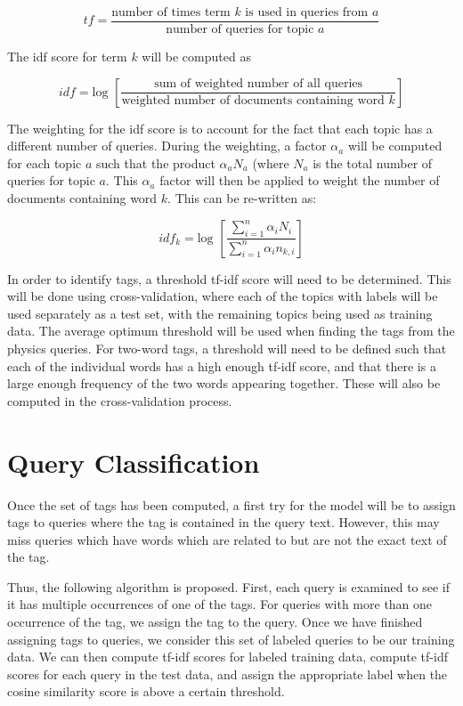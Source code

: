 \documentclass{article}
\def\eqstart{\begin{equation}}
\def\eqend{\end{equation}}
\begin{document}
\eqstart
tf = \frac{\textrm{number of times term \(k\) is used in queries from }
  a}{\textrm{number of queries for topic } a}
\eqend

The idf score for term \(k\)  will be computed as

\eqstart
idf = \textrm{log } \left[ \frac{\textrm{sum of weighted number of all
      queries}}{\textrm{weighted number of documents containing word } k} \right]
\eqend

The weighting for the idf score is to account for the fact that each topic has
a different number of queries. During the weighting, a factor \(\alpha_a\)
will be computed for each topic \(a\) such that the product \(\alpha_a N_a\)
(where \(N_a\) is the total number of queries for topic \(a\). This
\(\alpha_a\) factor will then be applied to weight the number of documents
containing word \(k\). This can be re-written as:

\eqstart
idf_k = \textrm{log } \left[ \frac{\sum_{i=1}^{n} \alpha_i N_i}{\sum_{i=1}^{n}
    \alpha_i n_{k,i}} \right] 
\eqend

In order to identify tags, a threshold tf-idf score will need to be
determined. This will be done using cross-validation, where each of the topics
with labels will be used separately as a test set, with the remaining topics
being used as training data. The average optimum threshold will be used when
finding the tags from the physics queries. For two-word tags, a threshold will
need to be defined such that each of the individual words has a high enough
tf-idf score, and that there is a large enough frequency of the two words
appearing together. These will also be computed in the cross-validation process.

\section{Query Classification}

Once the set of tags has been computed, a first try for the model will be to
assign tags to queries where the tag is contained in the query text. However,
this may miss queries which have words which are related to but are not the
exact text of the tag.

Thus, the following algorithm is proposed. First, each query is examined to
see if it has multiple occurrences of one of the tags. For queries with more
than one occurrence of the tag, we assign the tag to the query. Once we have
finished assigning tags to queries, we consider this set of labeled queries to
be our training data. We can then compute tf-idf scores for labeled training
data, compute tf-idf scores for each query in the test data, and assign the
appropriate label when the cosine similarity score is above a certain
threshold.
\end{document}
